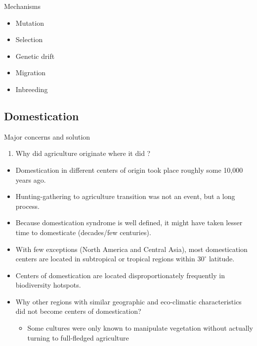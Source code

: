 \documentclass[
  ignorenonframetext,
  aspectratio=169]{beamer}
\providecommand{\tightlist}{%
  \setlength{\itemsep}{0pt}\setlength{\parskip}{0pt}}
\begin{document}
\begin{frame}{Mechanisms}
\protect\hypertarget{mechanisms}{}
\begin{itemize}
\tightlist
\item
  Mutation
\item
  Selection
\item
  Genetic drift
\item
  Migration
\item
  Inbreeding
\end{itemize}
\end{frame}

\hypertarget{domestication}{%
\subsection{Domestication}\label{domestication}}

\begin{frame}{Major concerns and solution}
\protect\hypertarget{major-concerns-and-solution}{}
\footnotesize

\begin{enumerate}[<+->]
\tightlist
\item
  \alert{Why did agriculture originate where it did ?}
\end{enumerate}

\begin{itemize}[<+->]
\tightlist
\item
  Domestication in different centers of origin took place roughly some
  10,000 years ago.
\item
  Hunting-gathering to agriculture transition was not an event, but a
  long process.
\item
  Because domestication syndrome is well defined, it might have taken
  lesser time to domesticate (decades/few centuries).
\item
  With few exceptions (North America and Central Asia), most
  domestication centers are located in subtropical or tropical regions
  within \(30^\circ\) latitude.
\item
  Centers of domestication are located disproportionately frequently in
  biodiversity hotspots.
\item
  Why other regions with similar geographic and eco-climatic
  characteristics did not become centers of domestication?

  \begin{itemize}[<+->]
  \tightlist
  \item
    Some cultures were only known to manipulate vegetation without
    actually turning to full-fledged agriculture
  \end{itemize}
\end{itemize}
\end{frame}
\end{document}

